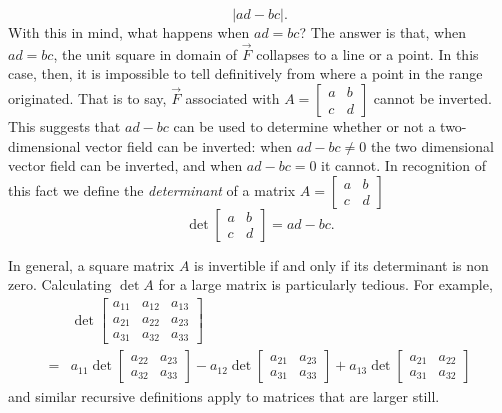 \documentclass[../book.tex]{subfiles}
\begin{document}
\begin{equation}\label{eq:vec-41}
|ad - bc|.
\end{equation}
With this in mind, what happens when \(ad=bc\)? The answer is that, when \(ad=bc\), the unit square in domain of \(\vec{F}\) collapses to a line or a point. In this case, then, it is impossible to tell definitively from where a point in the range originated. That is to say, \(\vec{F}\) associated with \(A = \begin{bmatrix}a & b \\ c & d\end{bmatrix}\) cannot be inverted. This suggests that \(ad-bc\) can be used to determine whether or not a two-dimensional vector field can be inverted: when \(ad-bc \neq 0\) the two dimensional vector field can be inverted, and when \(ad-bc = 0\) it cannot. In recognition of this fact we define the \emph{determinant} of a matrix \(A = \begin{bmatrix}a & b \\ c & d\end{bmatrix}\)
\begin{equation}\label{eq:vec-42}
\det \begin{bmatrix}
  a & b \\ c & d
\end{bmatrix} = ad - bc.
\end{equation}

In general, a square matrix \(A\) is invertible if and only if its determinant is non zero. Calculating \(\det A\) for a large matrix is particularly tedious. For example,
\begin{equation}\label{eq:vec-43}
\begin{aligned}
  & \det 
  \begin{bmatrix}
    a_{11} & a_{12} & a_{13} \\
    a_{21} & a_{22} & a_{23} \\
    a_{31} & a_{32} & a_{33}  
  \end{bmatrix} \\[5ex]
  =&
  a_{11}  
  \det
  \begin{bmatrix}
    a_{22} & a_{23} \\
    a_{32} & a_{33} 
  \end{bmatrix}
  -
  a_{12}  
  \det
  \begin{bmatrix}
    a_{21} & a_{23} \\
    a_{31} & a_{33} 
  \end{bmatrix}
  +
  a_{13}  
  \det
  \begin{bmatrix}
    a_{21} & a_{22} \\
    a_{31} & a_{32} 
  \end{bmatrix}
\end{aligned}
\end{equation}
and similar recursive definitions apply to matrices that are larger still.
\end{document}
